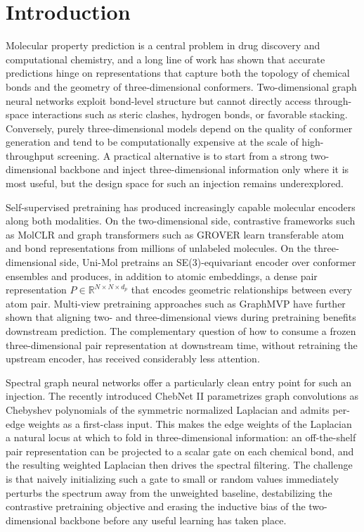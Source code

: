 \documentclass[sigconf,nonacm,anonymous,review]{acmart}
\begin{document}
\maketitle

\section{Introduction}
\label{sec:intro}

Molecular property prediction is a central problem in drug discovery and computational chemistry, and a long line of work has shown that accurate predictions hinge on representations that capture both the topology of chemical bonds and the geometry of three-dimensional conformers. Two-dimensional graph neural networks exploit bond-level structure but cannot directly access through-space interactions such as steric clashes, hydrogen bonds, or favorable stacking. Conversely, purely three-dimensional models depend on the quality of conformer generation and tend to be computationally expensive at the scale of high-throughput screening. A practical alternative is to start from a strong two-dimensional backbone and inject three-dimensional information only where it is most useful, but the design space for such an injection remains underexplored.

Self-supervised pretraining has produced increasingly capable molecular encoders along both modalities. On the two-dimensional side, contrastive frameworks such as MolCLR \citep{wang2022molclr} and graph transformers such as GROVER \citep{rong2020grover} learn transferable atom and bond representations from millions of unlabeled molecules. On the three-dimensional side, Uni-Mol \citep{zhou2023unimol} pretrains an SE(3)-equivariant encoder over conformer ensembles and produces, in addition to atomic embeddings, a dense pair representation $P \in \mathbb{R}^{N \times N \times d_p}$ that encodes geometric relationships between every atom pair. Multi-view pretraining approaches such as GraphMVP \citep{liu2022graphmvp} have further shown that aligning two- and three-dimensional views during pretraining benefits downstream prediction. The complementary question of how to consume a frozen three-dimensional pair representation at downstream time, without retraining the upstream encoder, has received considerably less attention.

Spectral graph neural networks offer a particularly clean entry point for such an injection. The recently introduced ChebNet II \citep{he2022chebnetii} parametrizes graph convolutions as Chebyshev polynomials of the symmetric normalized Laplacian and admits per-edge weights as a first-class input. This makes the edge weights of the Laplacian a natural locus at which to fold in three-dimensional information: an off-the-shelf pair representation can be projected to a scalar gate on each chemical bond, and the resulting weighted Laplacian then drives the spectral filtering. The challenge is that naively initializing such a gate to small or random values immediately perturbs the spectrum away from the unweighted baseline, destabilizing the contrastive pretraining objective and erasing the inductive bias of the two-dimensional backbone before any useful learning has taken place.
\end{document}
